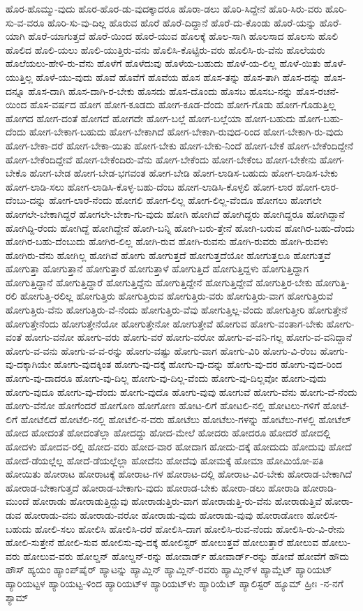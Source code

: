{ಹೊರ-ಹೊಮ್ಮು-ವುದು
ಹೊರ-ಹೊರ-ಡು-ವುದಕ್ಕಾದರೂ
ಹೊರಾ-ಡಲು
ಹೊರಿ-ಸಿದ್ದೇನೆ
ಹೊರಿ-ಸಿರು-ವರು
ಹೊರಿ-ಸು-ವ-ವರೂ
ಹೊರಿ-ಸು-ವು-ದಿಲ್ಲ
ಹೊರುವ
ಹೊರೆ
ಹೊರೆ-ದಿದ್ದಾನೆ
ಹೊರೆ-ದು-ಕೊಂಡು
ಹೊರೆ-ಯನ್ನು
ಹೊರೆ-ಯಾಗಿ
ಹೊರೆ-ಯಾಗುತ್ತದೆ
ಹೊರೆ-ಯಿಂದ
ಹೊರೆ-ಯುವ
ಹೊಲಕ್ಕೆ
ಹೊಲ-ಸಾಗಿ
ಹೊಲಸಾದ
ಹೊಲಸು
ಹೊಲಿ
ಹೊಲಿದ
ಹೊಲಿ-ಯಲು
ಹೊಲಿ-ಯುತ್ತಿರು-ವನು
ಹೊಲಿಸಿ-ಕೊಟ್ಟಿರು-ವರು
ಹೊಲಿಸಿ-ರು-ವೆನು
ಹೊಲೆಯರು
ಹೊಲೆಯಲು-ಹೇಳಿ-ರು-ವೆನು
ಹೊಳೆಗೆ
ಹೊಳೆದುವು
ಹೊಳೆಯ-ಬಹುದು
ಹೊಳೆ-ಯ-ಲಿಲ್ಲ
ಹೊಳೆ-ಯಿತು
ಹೊಳೆ-ಯುತ್ತಿಲ್ಲ
ಹೊಳೆ-ಯು-ವುದು
ಹೊವೆ
ಹೊವೆಗೆ
ಹೊವೆಯ
ಹೊಸ
ಹೊಸ-ತನ್ನು
ಹೊಸ-ತಾಗಿ
ಹೊಸ-ದನ್ನು
ಹೊಸ-ದನ್ನೂ
ಹೊಸ-ದಾಗಿ
ಹೊಸ-ದಾಗಿ-ರ-ಬೇಕು
ಹೊಸದು
ಹೊಸ-ದೊಂದು
ಹೊಸಬ
ಹೊಸಬ-ನನ್ನು
ಹೊಸ-ರಚನೆ-ಯಿಂದ
ಹೊಸ-ವರ್ಷದ
ಹೋಗ
ಹೋಗ-ಕೂಡದು
ಹೋಗ-ಕೂಡ-ದೆಂದು
ಹೋಗ-ಗೊಡು
ಹೋಗ-ಗೊಡುತ್ತಿಲ್ಲ
ಹೋಗದ
ಹೋಗ-ದಂತೆ
ಹೋಗದೆ
ಹೋಗದೇ
ಹೋಗ-ಬಲ್ಲೆ
ಹೋಗ-ಬಲ್ಲೆಯಾ
ಹೋಗ-ಬಹುದು
ಹೋಗ-ಬಹು-ದೆಂದು
ಹೋಗ-ಬೇಕಾಗ-ಬಹುದು
ಹೋಗ-ಬೇಕಾಗಿದೆ
ಹೋಗ-ಬೇಕಾಗಿ-ರುವುದ-ರಿಂದ
ಹೋಗ-ಬೇಕಾಗಿ-ರು-ವುದು
ಹೋಗ-ಬೇಕಾ-ದರೆ
ಹೋಗ-ಬೇಕಾ-ಯಿತು
ಹೋಗ-ಬೇಕು
ಹೋಗ-ಬೇಕು-ನಿಂದೆ
ಹೋಗ-ಬೇಕೆ
ಹೋಗ-ಬೇಕೆಂದಿದ್ದೇನೆ
ಹೋಗ-ಬೇಕೆಂದಿದ್ದೇವೆ
ಹೋಗ-ಬೇಕೆಂದಿರು-ವೆನು
ಹೋಗ-ಬೇಕೆಂದು
ಹೋಗ-ಬೇಕೆಂಬ
ಹೋಗ-ಬೇಕೇನು
ಹೋಗ-ಬೇಕೊ
ಹೋಗ-ಬೇಡ
ಹೋಗ-ಬೇಡ-ಭಗವಂತ
ಹೋಗ-ಬೇಡಿ
ಹೋಗ-ಲಾಡಿಸ-ಬಹುದು
ಹೋಗ-ಲಾಡಿಸ-ಬೇಕು
ಹೋಗ-ಲಾಡಿ-ಸಲು
ಹೋಗ-ಲಾಡಿಸಿ-ಕೊಳ್ಳ-ಬಹು-ದೆಂಬ
ಹೋಗ-ಲಾಡಿಸಿ-ಕೊಳ್ಳಲಿ
ಹೋಗ-ಲಾರ
ಹೋಗ-ಲಾರ-ದೆಂಬು-ದನ್ನು
ಹೋಗ-ಲಾರೆ-ನೆಂದು
ಹೋಗಲಿ
ಹೋಗ-ಲಿಲ್ಲ
ಹೋಗ-ಲಿಲ್ಲ-ವೆಂದೂ
ಹೋಗಲು
ಹೋಗಲೇ
ಹೋಗಲೇ-ಬೇಕಾಗಿದ್ದರೆ
ಹೋಗಲೇ-ಬೇಕಾ-ಗು-ವುದು
ಹೋಗಿ
ಹೋಗಿದೆ
ಹೋಗಿದ್ದರು
ಹೋಗಿದ್ದರೂ
ಹೋಗಿದ್ದಾನೆ
ಹೋಗಿದ್ದಿ-ರೆಂದು
ಹೋಗಿದ್ದೆ
ಹೋಗಿದ್ದೇನೆ
ಹೋಗಿ-ಬನ್ನಿ
ಹೋಗಿ-ಬರು-ತ್ತೇನೆ
ಹೋಗಿ-ಬರುವ
ಹೋಗಿರ-ಬಹು-ದೆಂದು
ಹೋಗಿರ-ಬಹು-ದೆಂಬುದು
ಹೋಗಿರ-ಲಿಲ್ಲ
ಹೋಗಿ-ರುವ
ಹೋಗಿ-ರುವನು
ಹೋಗಿ-ರುವರು
ಹೋಗಿ-ರುವಳು
ಹೋಗಿರು-ವೆನು
ಹೋಗಿಲ್ಲ
ಹೋಗಿವೆ
ಹೋಗು
ಹೋಗುತ್ತದೆ
ಹೋಗುತ್ತದೆಯೋ
ಹೋಗುತ್ತಲೂ
ಹೋಗುತ್ತವೆ
ಹೋಗುತ್ತಾ
ಹೋಗುತ್ತಾನೆ
ಹೋಗುತ್ತಾರೆ
ಹೋಗುತ್ತಾಳೆ
ಹೋಗುತ್ತಿದೆ
ಹೋಗುತ್ತಿದ್ದಳು
ಹೋಗುತ್ತಿದ್ದಾಗ
ಹೋಗುತ್ತಿದ್ದಾನೆ
ಹೋಗುತ್ತಿದ್ದಾರೆ
ಹೋಗುತ್ತಿದ್ದೆನು
ಹೋಗುತ್ತಿದ್ದೇನೆ
ಹೋಗುತ್ತಿದ್ದೇವೆ
ಹೋಗುತ್ತಿರ-ಬೇಕು
ಹೋಗುತ್ತಿ-ರಲಿ
ಹೋಗುತ್ತಿ-ರಲಿಲ್ಲ
ಹೋಗುತ್ತಿರು
ಹೋಗುತ್ತಿರುವ
ಹೋಗುತ್ತಿರು-ವರು
ಹೋಗುತ್ತಿರು-ವಾಗ
ಹೋಗುತ್ತಿರುವೆ
ಹೋಗುತ್ತಿರು-ವೆನು
ಹೋಗುತ್ತಿರು-ವೆ-ನೆಂದು
ಹೋಗುತ್ತಿರು-ವೆವು
ಹೋಗುತ್ತಿಲ್ಲ-ವೆಂದು
ಹೋಗುತ್ತೀರಿ
ಹೋಗುತ್ತೇನೆ
ಹೋಗುತ್ತೇನೆಂದು
ಹೋಗುತ್ತೇನೆಯೋ
ಹೋಗುತ್ತೇನೋ
ಹೋಗುತ್ತೇವೆ
ಹೋಗುವ
ಹೋಗು-ವಂತಾಗ-ಬೇಕು
ಹೋಗು-ವಂತೆ
ಹೋಗು-ವನೋ
ಹೋಗು-ವರು
ಹೋಗು-ವರೆ
ಹೋಗು-ವರೋ
ಹೋಗು-ವ-ವನಿ-ಗಲ್ಲ
ಹೋಗು-ವ-ವನಿದ್ದಾನೆ
ಹೋಗು-ವ-ವನು
ಹೋಗು-ವ-ವ-ರನ್ನು
ಹೋಗು-ವಷ್ಟು
ಹೋಗು-ವಾಗ
ಹೋಗು-ವಿರಿ
ಹೋಗು-ವಿ-ರೆಂಬ
ಹೋಗು-ವು-ದಕ್ಕಾಗಿಯೇ
ಹೋಗು-ವುದಕ್ಕಿಂತ
ಹೋಗು-ವು-ದಕ್ಕೆ
ಹೋಗು-ವು-ದನ್ನು
ಹೋಗು-ವು-ದರ
ಹೋಗು-ವುದ-ರಿಂದ
ಹೋಗು-ವು-ದಾದರೂ
ಹೋಗು-ವು-ದಿಲ್ಲ
ಹೋಗು-ವು-ದಿಲ್ಲ-ವೆಂದು
ಹೋಗು-ವು-ದಿಲ್ಲವೋ
ಹೋಗು-ವುದು
ಹೋಗು-ವುದೂ
ಹೋಗು-ವು-ದೆಂದು
ಹೋಗು-ವುದೊ
ಹೋಗು-ವುವು
ಹೋಗುವೆ
ಹೋಗು-ವೆನು
ಹೋಗು-ವೆ-ನೆಂದು
ಹೋಗು-ವೆನೋ
ಹೋಗೆಂದರೆ
ಹೋಗೊಣ
ಹೋಗೋಣ
ಹೋಟ-ಲಿಗೆ
ಹೋಟಲಿ-ನಲ್ಲಿ
ಹೋಟಲು-ಗಳಿಗೆ
ಹೋಟೆ-ಲಿಗೆ
ಹೋಟೆಲಿದೆ
ಹೋಟೆಲಿ-ನಲ್ಲಿ
ಹೋಟೆಲಿ-ನ-ವರು
ಹೋಟೆಲು
ಹೋಟೆಲು-ಗಳನ್ನು
ಹೋಟೆಲು-ಗಳಲ್ಲಿ
ಹೋಟೆಲ್
ಹೋದ
ಹೋದಂತೆ
ಹೋದಂತೆಲ್ಲಾ
ಹೋದದ್ದು
ಹೋದ-ಮೇಲೆ
ಹೋದರು
ಹೋದರೂ
ಹೋದರೆ
ಹೋದಲ್ಲಿ
ಹೋದಳು
ಹೋದವ-ರಲ್ಲಿ
ಹೋದ-ವರು
ಹೋದ-ವಾರ
ಹೋದಾಗ
ಹೋದು-ದಕ್ಕೆ
ಹೋದುದು
ಹೋದುವು
ಹೋದೆ
ಹೋದೆ-ಡೆಯಲ್ಲೆಲ್ಲ
ಹೋದೆ-ಡೆಯಲ್ಲೆಲ್ಲಾ
ಹೋದೆನು
ಹೋದೆವು
ಹೋಮಕ್ಕೆ
ಹೋಮಾ
ಹೋಮಿಯೋ-ಪತಿ
ಹೋಯಿತು
ಹೋರಾಟ
ಹೋರಾಟಕ್ಕೆ
ಹೋರಾಟ-ಗಳ
ಹೋರಾಟ-ದಲ್ಲಿ
ಹೋರಾಟ-ವಿರ-ಬೇಕು
ಹೋರಾಡ-ಬೇಕಾಗಿದೆ
ಹೋರಾಡ-ಬೇಕಾಗುತ್ತದೆ
ಹೋರಾಡ-ಬೇಕಾಗು-ವುದು
ಹೋರಾಡ-ಬೇಕು
ಹೋರಾ-ಡಲು
ಹೋರಾಡಿ
ಹೋರಾಡಿ-ಮುಂದೆ
ಹೋರಾಡು
ಹೋರಾಡುತ್ತಿದ್ದುವು
ಹೋರಾಡುತ್ತಿರು-ವಾಗ
ಹೋರಾಡುತ್ತಿ-ರು-ವೆನು
ಹೋರಾಡುತ್ತಿವೆ
ಹೋರಾ-ಡುವ
ಹೋರಾಡು-ವನು
ಹೋರಾಡು-ವರೋ
ಹೋರಾಡು-ವುದು
ಹೋರಾಡು-ವುವು
ಹೋರಾಡೋಣ
ಹೋಲಿಸ-ಬಹುದು
ಹೋಲಿ-ಸಲು
ಹೋಲಿಸಿ
ಹೋಲಿಸಿ-ದರೆ
ಹೋಲಿಸಿ-ದಾಗ
ಹೋಲಿಸಿ-ರುವ-ನೆಂದು
ಹೋಲಿಸಿ-ರು-ವಿ-ರೇನು
ಹೋಲಿ-ಸುತ್ತೇನೆ
ಹೋಲಿ-ಸುವ
ಹೋಲಿಸು-ವು-ದಕ್ಕೆ
ಹೋಲಿಸ್ಟರ್
ಹೋಲುತ್ತವೆ
ಹೋಲುತ್ತಾರೆ
ಹೋಲುವ
ಹೋಲು-ವರು
ಹೋಲುವ-ವರು
ಹೋಲ್ಡನ್
ಹೋಲ್ಡನ್‌-ರನ್ನು
ಹೋವಾರ್ಡ್
ಹೋವಾರ್ಡ್‌-ರನ್ನು
ಹೋವೆ
ಹೋವೆಗೆ
ಹೌದು
ಹೌಸ್
ಹ್ಯಯಂ
ಹ್ಯಾಂಪ್‌ಷೈರ್
ಹ್ಯಾಟನ್ನು
ಹ್ಯಾಮ್ಲಿನ್
ಹ್ಯಾಮ್ಲಿನ್‌-ರವರು
ಹ್ಯಾಮ್ಲಿನ್‌ಳ
ಹ್ಯಾಮ್ಲೆಟ್
ಹ್ಯಾರಿಯಟ್
ಹ್ಯಾರಿಯಟ್ಟಳ
ಹ್ಯಾರಿಯಟ್ಟ-ಳಿಂದ
ಹ್ಯಾರಿಯಟ್‌ಳ
ಹ್ಯಾರಿಯಟ್‌ಳು
ಹ್ಯಾರಿಯೆಟ್
ಹ್ಯಾಲಿಸ್ಟರ್
ಹ್ಯೂಮ್
ಹ್ರೀಃ
‌-ನ-ನಗೆ
‌ಶ್ಯಾಮ್
}
